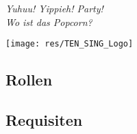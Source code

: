 \vspace*{\fill}
\begin{flushright}
\textit{Yuhuu! Yippieh! Party!}\\
\textit{Wo ist das Popcorn?}
\end{flushright}

\tableofcontents

\vspace{3mm}

\begin{minipage}{\textwidth}
\begin{center}
\texttt{[image: res/TEN\_SING\_Logo]}
\end{center}
\end{minipage}

\pagebreak

\subsection{Rollen}
\usehyperlinkstrue
\ListOfPersons
\subsection{Requisiten}
\ListOfRequisites






















